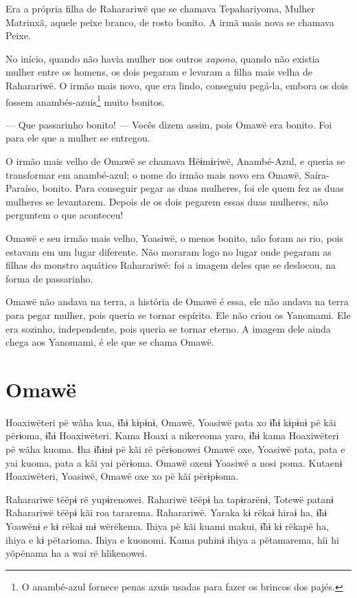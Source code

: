 Era a própria filha de Raharariwë que se chamava Tepahariyoma, Mulher Matrinxã, 
aquele peixe branco, de rosto bonito. A irmã mais nova se chamava Peixe. 

No início, quando não havia mulher nos outros \textit{xapono}, quando não existia
mulher entre os homens, os dois pegaram e levaram a filha mais velha de
Raharariwë. O irmão mais novo, que era lindo, conseguiu pegá-la, embora
os dois fossem anambés-azuis\footnote{O anambé-azul fornece penas azuis usadas para fazer os brincos dos
pajés.} muito bonitos. 

--- Que passarinho bonito! --- Vocês dizem assim, pois Omawë era bonito.
Foi para ele que a mulher se entregou. 

O irmão mais velho de Omawë se chamava Hëɨmɨriwë, Anambé-Azul, e queria se transformar em
anambé-azul; o nome do irmão mais novo era Omawë,
Saíra-Paraíso, bonito. Para conseguir pegar as duas mulheres, foi ele
quem fez as duas mulheres se levantarem. Depois de os dois pegarem essas
duas mulheres, não perguntem o que aconteceu! 

Omawë e seu irmão mais velho, Yoasiwë, o menos bonito, não foram ao rio,
pois estavam em um lugar diferente. Não moraram logo no lugar onde
pegaram as filhas do monstro aquático Raharariwë: foi a imagem deles que
se deslocou, na forma de passarinho.

Omawë não andava na terra, a história de Omawë é essa, ele não
andava na terra para pegar mulher, pois queria se tornar espírito. Ele
não criou os Yanomami. Ele era sozinho, independente, pois queria se
tornar eterno. A imagem dele ainda chega aos Yanomami, é ele que se
chama Omawë.

\chapter{Omawë}

 Hoaxiwëteri pë wãha kua, ɨ̃hɨ kɨpɨnɨ, Omawë, Yoasiwë pata xo ɨ̃hɨ
kɨpɨnɨ pë kãi përɨoma, ɨ̃hɨ Hoaxiwëteri. Kama Hoaxi a nikereoma yaro, ɨ̃hɨ
kama Hoaxiwëteri pë wãha kuoma. Ɨha ɨ̃hɨnɨ pë kãi rë përɨonowei Omawë
oxe, Yoasiwë pata, pata e yai kuoma, pata a kãi yai përɨoma. Omawë oxenɨ
Yoasiwë a nosi poma. Kutaenɨ Hoaxiwëteri, Yoasiwë, Omawë oxe xo pë kãi
përɨpɨoma.

Raharariwë tëëpɨ rë yupɨrenowei. Rahariwë tëëpɨ ha tapɨrarënɨ, Totewë
patanɨ Raharariwë tëëpɨ kãi roa tararema. Raharariwë. Yaraka kɨ rëkaɨ
hiraɨ ha, ɨ̃hɨ Yoawënɨ e kɨ rëkaɨ mɨ wërëkema. Ihiya pë kãi kuami makui,
ɨ̃hɨ kɨ rëkapë ha, ihiya e kɨ pëtarioma. Ihiya e kuonomi. Kama puhinɨ
ihiya a pëtamarema, hii hi yõpënama ha a wai rë hĩikenowei. 


